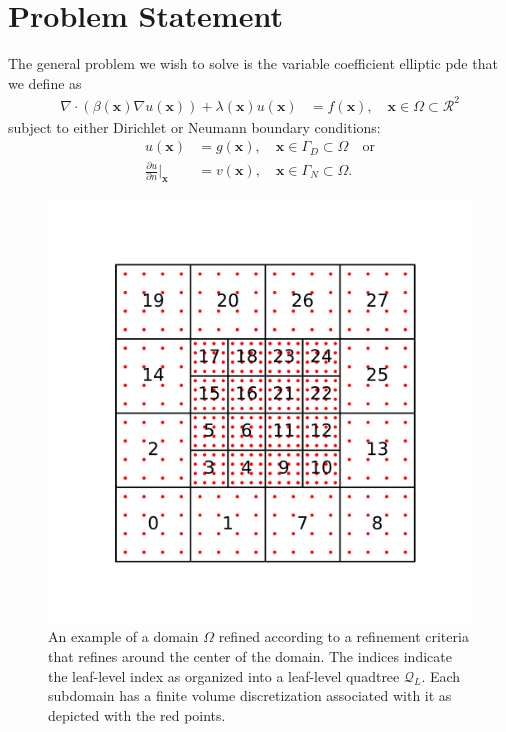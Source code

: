 \section{Problem Statement}
\label{sec:problem-statement}

The general problem we wish to solve is the variable coefficient elliptic \gls{pde} that we define as
\begin{align}
    \label{eq:elliptic-pde}
    \nabla \cdot \left( \beta(\textbf{x}) \nabla u(\textbf{x}) \right) + \lambda(\textbf{x}) u(\textbf{x}) &= f(\textbf{x}), \quad \textbf{x} \in \Omega \subset \mathcal{R}^2
\end{align}
subject to either Dirichlet or Neumann boundary conditions:
\begin{align}
    \label{eq:elliptic-pde-bc1}
    u(\textbf{x}) &= g(\textbf{x}), \quad \textbf{x} \in \Gamma_D \subset \Omega \quad \mbox{or}\\
    \label{eq:elliptic-pde-bc2}
    \frac{\partial u}{\partial n} \Big|_{\textbf{x}} &= v(\textbf{x}), \quad \textbf{x} \in \Gamma_N \subset \Omega.
\end{align}

\begin{figure}
    \centering
    \includegraphics[width=\textwidth, clip=true, trim={0 160 0 160}]{figures/adaptive-mesh-serial.pdf}
    \caption{An example of a domain $\Omega$ refined according to a refinement criteria that refines around the center of the domain. The indices indicate the leaf-level index as organized into a leaf-level quadtree $\mathcal{Q}_L$. Each subdomain has a finite volume discretization associated with it as depicted with the red points.}
    \label{fig:adaptive-mesh-serial}
\end{figure}

